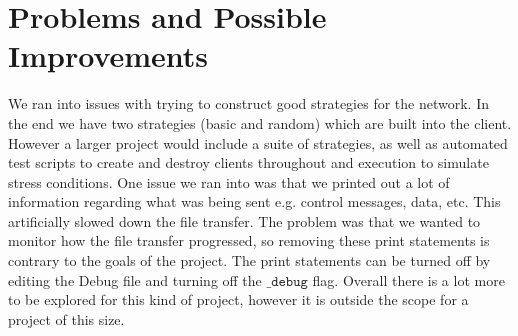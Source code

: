 \documentclass[12pt]{article}
\begin{document}
\section{Problems and Possible Improvements}
We ran into issues with trying to construct good strategies for the network. In the end we have two strategies (basic and random) which are built into the client. However a larger project would include a suite of strategies, as well as automated test scripts to create and destroy clients throughout and execution to simulate stress conditions. One issue we ran into was that we printed out a lot of information regarding what was being sent e.g. control messages, data, etc. This artificially slowed down the file transfer. The problem was that we wanted to monitor how the file transfer progressed, so removing these print statements is contrary to the goals of the project. The print statements can be turned off by editing the Debug file and turning off the $\texttt{\_debug}$ flag. Overall there is a lot more to be explored for this kind of project, however it is outside the scope for a project of this size. 
\end{document}
